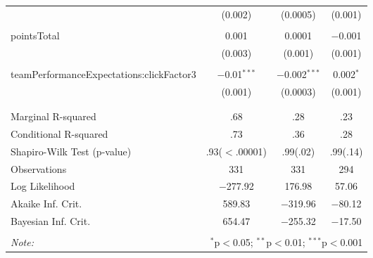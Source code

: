 \begin{table}[!htbp]
\begin{tabular}{@{\extracolsep{5pt}}lccc}
  & (0.002) & (0.0005) & (0.001) \\ 
  & & & \\ 
 pointsTotal & 0.001 & 0.0001 & $-$0.001 \\ 
  & (0.003) & (0.001) & (0.001) \\ 
  & & & \\ 
 teamPerformanceExpectations:clickFactor3 & $-$0.01$^{***}$ & $-$0.002$^{***}$ & 0.002$^{*}$ \\ 
  & (0.001) & (0.0003) & (0.001) \\ 
  & & & \\ 
\hline \\[-1.8ex] 
Marginal R-squared & .68 & .28 & .23 \\ 
Conditional R-squared & .73 & .36 & .28 \\ 
Shapiro-Wilk Test (p-value) & .93($<$.00001) & .99(.02) & .99(.14) \\ 
Observations & 331 & 331 & 294 \\ 
Log Likelihood & $-$277.92 & 176.98 & 57.06 \\ 
Akaike Inf. Crit. & 589.83 & $-$319.96 & $-$80.12 \\ 
Bayesian Inf. Crit. & 654.47 & $-$255.32 & $-$17.50 \\ 
\hline 
\hline \\[-1.8ex] 
\textit{Note:}  & \multicolumn{3}{r}{$^{*}$p$<$0.05; $^{**}$p$<$0.01; $^{***}$p$<$0.001} \\ 
\end{tabular} 
\end{table} 
